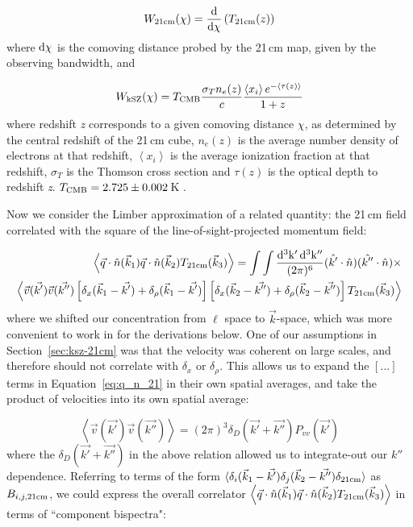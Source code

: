 \begin{equation}
W_{\rm 21cm}(\chi) = {\rm \frac{d}{d\chi}}\left(T_{\rm 21cm}(z)\right)
\label{eq:W21cm}
\end{equation}
where ${\rm d\chi}$ is the comoving distance probed by the 21\,cm map, given by the observing bandwidth, and

\begin{equation}
W_{\rm kSZ}(\chi) = T_{\rm CMB} \frac{\sigma_T n_e(z)}{c}\frac{\left\langle x_i \right\rangle e^{-\left\langle \tau(z) \right\rangle } }{1+z}
\label{eq:WkSZ}
\end{equation}
where redshift \textit{z} corresponds to a given comoving distance $\chi$, as determined by the central redshift of the 21\,cm cube, $n_e(z)$ is the average number density of electrons at that redshift, $\left\langle x_i \right\rangle $ is the average ionization fraction at that redshift, $\sigma_T$ is the Thomson cross section and $\tau (z)$ is the optical depth to redshift \textit{z}. $T_{\rm CMB} = 2.725\pm0.002$\,K \citep{Mather.99}.

Now we consider the Limber approximation of a related quantity: the 21\,cm field correlated with the square of the line-of-sight-projected momentum field:

\begin{equation}
\begin{split}
\left\langle \vec{q} \cdot \hat{n}(\vec{k}_1) \vec{q} \cdot \hat{n} (\vec{k}_2) T_{\rm 21cm}(\vec{k}_3) \right\rangle =
\int \int \frac{ {\rm d^3k' \, d^3k''} }{(2\pi)^6} (\hat{k'}\cdot\hat{n}) (\hat{k''}\cdot\hat{n}) \times \\
\left\langle 
\vec{v}(\vec{k'})\vec{v}(\vec{k''}) 
\left[ \delta_x(\vec{k}_1 - \vec{k'}) + \delta_{\rho}(\vec{k}_1 - \vec{k'})\right]
\left[ \delta_x(\vec{k}_2 - \vec{k''}) + \delta_{\rho}(\vec{k}_2 - \vec{k''})\right] 
T_{\rm 21cm}(\vec{k}_3)
\right\rangle
\end{split}
\label{eq:q_n_21}
\end{equation}
where we shifted our concentration from $\ell$ space to $\vec{k}$-space, which was more convenient to work in for the derivations below.
One of our assumptions in Section~\ref{sec:ksz-21cm} was that the velocity was coherent on large scales, and therefore should not correlate with $\delta_{x}$ or $\delta_{\rho}$. This allows us to expand the $[...]$ terms in Equation~\ref{eq:q_n_21} in their own spatial averages, and take the product of velocities into its own spatial average:

\begin{equation}
\left\langle \vec{v}(\vec{k'})\vec{v}(\vec{k''}) \right\rangle = (2\pi)^3 \delta_D(\vec{k'} + \vec{k''})P_{vv}(\vec{k'})
\label{eq:Pvv}
\end{equation}
where the $\delta_D(\vec{k'} + \vec{k''})$ in the above relation allowed us to integrate-out our $k''$ dependence. Referring to terms of the form $\langle \delta_i(\vec{k}_1 - \vec{k'}) \delta_j(\vec{k}_2 - \vec{k''}) \delta_{\rm 21cm}\rangle$ as $B_{i,j,{\rm 21cm}}$, we could express the overall correlator $\left\langle \vec{q} \cdot \hat{n}(\vec{k}_1) \vec{q} \cdot \hat{n} (\vec{k}_2) T_{\rm 21cm}(\vec{k}_3) \right\rangle$ in terms of ``component bispectra":

